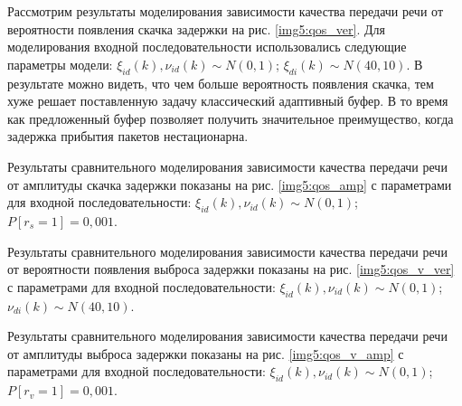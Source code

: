 Рассмотрим результаты моделирования зависимости качества передачи речи от вероятности появления скачка задержки на рис. \ref{img5:qos_ver}.
Для моделирования входной последовательности использовались следующие параметры модели:
$\xi_{id}(k),\nu_{id}(k)\sim N(0,1)$; $\xi_{di}(k)\sim N(40,10)$.
В результате можно видеть, что чем больше вероятность появления скачка, тем хуже решает поставленную задачу классический адаптивный буфер.
В то время как предложенный буфер позволяет получить значительное преимущество, когда задержка прибытия пакетов нестационарна.

Результаты сравнительного моделирования зависимости качества передачи речи от амплитуды скачка задержки показаны на рис. \ref{img5:qos_amp} с параметрами для входной последовательности:
$\xi_{id}(k),\nu_{id}(k)\sim N(0,1)$; $P[r_s=1]=0,001$.

Результаты сравнительного моделирования зависимости качества передачи речи от вероятности появления выброса задержки показаны на рис. \ref{img5:qos_v_ver} с параметрами для входной последовательности:
$\xi_{id}(k),\nu_{id}(k)\sim N(0,1)$; $\nu_{di}(k)\sim N(40,10)$.

Результаты сравнительного моделирования зависимости качества передачи речи от амплитуды выброса задержки показаны на рис. \ref{img5:qos_v_amp} с параметрами для входной последовательности:
$\xi_{id}(k),\nu_{id}(k)\sim N(0,1)$; $P[r_v=1]=0,001$.


